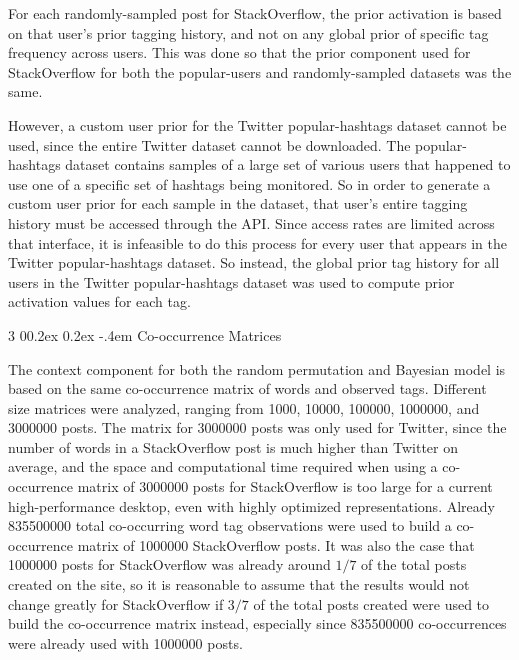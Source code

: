 \documentclass[man,floatsintext,donotrepeattitle]{apa6}
\makeatletter
\renewcommand{\subsubsection}{%
  \@startsection
  {subsubsection}%
  {3}%
  {\parindent}%
  {0\baselineskip \@plus 0.2ex \@minus 0.2ex}%
  {-.4em}%
  {\normalfont\normalsize\bfseries\addperi}}
\makeatother
\begin{document}
For each randomly-sampled post for StackOverflow, the prior activation is based on that user's prior tagging history, and not on any global prior of specific tag frequency across users.
This was done so that the prior component used for StackOverflow for both the popular-users and randomly-sampled datasets was the same.

However, a custom user prior for the Twitter popular-hashtags dataset cannot be used, since the entire Twitter dataset cannot be downloaded.
The popular-hashtags dataset contains samples of a large set of various users that happened to use one of a specific set of hashtags being monitored.
So in order to generate a custom user prior for each sample in the dataset, that user's entire tagging history must be accessed through the API.
Since access rates are limited across that interface, it is infeasible to do this process for every user that appears in the Twitter popular-hashtags dataset.
So instead, the global prior tag history for all users in the Twitter popular-hashtags dataset was used to compute prior activation values for each tag.

\subsubsection{Co-occurrence Matrices}

The context component for both the random permutation and Bayesian model is based on the same co-occurrence matrix of words and observed tags.
Different size matrices were analyzed, ranging from \num{1000}, \num{10000}, \num{100000}, \num{1000000}, and \num{3000000} posts.
The matrix for \num{3000000} posts was only used for Twitter, since the number of words in a StackOverflow post is much higher than Twitter on average,
and the space and computational time required when using a co-occurrence matrix of \num{3000000} posts for StackOverflow is too large for a current high-performance desktop, even with highly optimized representations.
Already \num{835500000} total co-occurring word tag observations were used to build a co-occurrence matrix of \num{1000000} StackOverflow posts.
It was also the case that \num{1000000} posts for StackOverflow was already around $1/7$ of the total posts created on the site,
so it is reasonable to assume that the results would not change greatly for StackOverflow if $3/7$ of the total posts created were used to build the co-occurrence matrix instead,
especially since \num{835500000} co-occurrences were already used with \num{1000000} posts.
\end{document}
